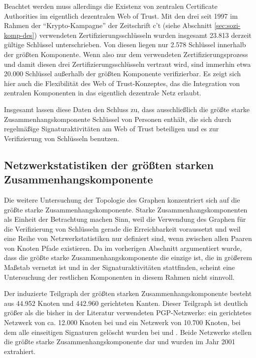 Beachtet werden muss
allerdings die Existenz von zentralen Certificate Authorities im
eigentlich dezentralen Web of Trust. Mit den drei seit 1997 im Rahmen
der ``Krypto-Kampagne'' der Zeitschrift c't (siehe Abschnitt
\ref{sec:sozi-komp-des}) verwendeten Zertifizierungsschlüsseln
wurden insgesamt 23.813 derzeit gültige Schlüssel
unterschrieben. Von diesen liegen nur 2.578 Schlüssel innerhalb der
größten Komponente. Wenn also nur dem verwendeten
Zertifizierungsprozess und damit diesen drei
Zertifizierungsschlüsseln vertraut wird, sind immerhin etwa 20.000
Schlüssel außerhalb der größten Komponente verifizierbar. Es
zeigt sich hier auch die Flexibilität des Web of Trust-Konzeptes,
das die Integration von zentralen Komponenten in das eigentlich
dezentrale Netz erlaubt.

Insgesamt lassen diese Daten den Schluss zu, dass ausschließlich die
größte starke Zusammenhangskomponente Schlüssel von Personen
enthält, die sich durch regelmäßige Signaturaktivitäten am Web
of Trust beteiligen und es zur Verifizierung von Schlüsseln
benutzen. 

\subsection{Netzwerkstatistiken der größten starken
  Zusammenhangskomponente}
\label{sec:kennz-des-graph}

Die weitere Untersuchung der Topologie des Graphen konzentriert sich
auf die größte starke Zusammenhangskomponente. Starke
Zusammenhangskomponenten als Einheit der Betrachtung machen Sinn, weil
die Verwendung des Graphen für die Verifizierung von Schlüsseln
gerade die Erreichbarkeit voraussetzt und weil eine Reihe von
Netzwerkstatistiken nur definiert sind, wenn zwischen allen Paaren von
Knoten Pfade existieren. Da im vorherigen Abschnitt argumentiert
wurde, dass die größte starke Zusammenhangskomponente die einzige
ist, die in größerem Maßstab vernetzt ist und in der
Signaturaktivitäten stattfinden, scheint eine Untersuchung der
restlichen Komponenten in diesem Rahmen nicht sinnvoll.

Der induzierte Teilgraph der größten starken
Zusammenhangskomponente besteht aus 44.952 Knoten und 442.960
gerichteten Kanten. Dieser Teilgraph ist deutlich größer als die
bisher in der Literatur verwendeten PGP-Netzwerke:  ein gerichtetes
Netzwerk von ca. 12.000 Knoten bei \cite{Capkun2002} und ein Netzwerk
von 10.700 Knoten, bei dem alle einseitigen Signaturen gelöscht
wurden bei \cite{Boguna2004} und \cite{Gregory2010}. Beide Netzwerke
stellen die größte starke Zusammenhangskomponente dar und wurden im
Jahr 2001 extrahiert.

